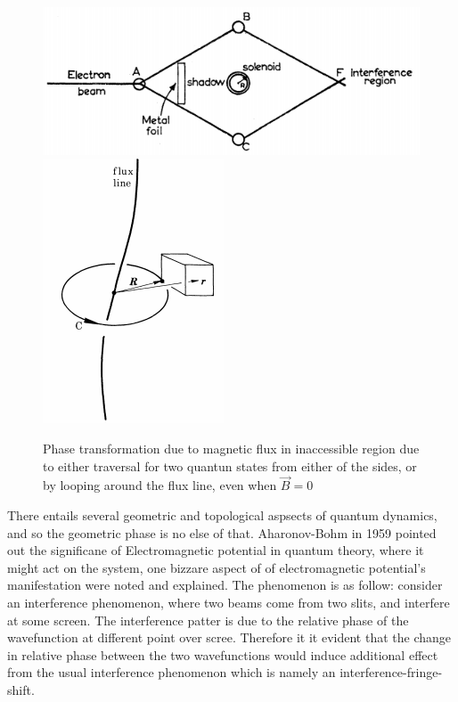 \documentclass[8pt, twocoloumn]{article}
\begin{document}
\begin{figure}[h!]
\begin{center}
\includegraphics[scale = 0.4]{vectorAB.png}
\hspace{0.2in}
\includegraphics[scale = 0.5]{berryAB.png}
\caption{Phase transformation due to magnetic flux in inaccessible region due to either traversal for two quantun states from either of the sides, or by looping around the flux line, even when $\vec{B}=0$}
\end{center}
\end{figure}


There entails several geometric and topological aspsects of quantum dynamics, and so the geometric phase is no else of that.
Aharonov-Bohm in 1959 pointed out the significane of Electromagnetic potential in quantum theory, where it might act on the system, one bizzare aspect of of electromagnetic potential's manifestation were noted and explained. 
The phenomenon is as follow: consider an interference phenomenon, where two beams come from two slits, and interfere at some screen. The interference patter is due to the relative phase of the wavefunction at different point over scree. Therefore it it evident that the change in relative phase between the two wavefunctions would induce additional effect from the usual interference phenomenon which is namely an interference-fringe-shift.
\end{document}
